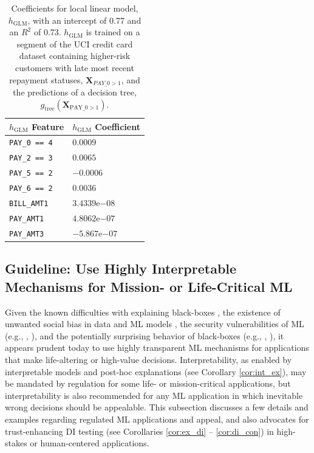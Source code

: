 \documentclass{article}
\begin{document}
\begin{table}
  	\caption{Coefficients for local linear model, $h_{\text{GLM}}$, with an intercept of 0.77 and an $R^2$ of 0.73. $h_{\text{GLM}}$ is trained on a segment of the UCI credit card dataset containing higher-risk customers with late most recent repayment statuses, $\mathbf{X}_{PAY \_ 0 > 1}$, and the predictions of a decision tree, $g_{\text{tree}}(\mathbf{X}_{\text{PAY\_0} > 1})$.\\}
  	\label{tab:lime}
  	\centering
  	\begin{tabular}{ll}
    	\toprule
    	$h_{\text{GLM}}$ Feature & $h_{\text{GLM}}$ Coefficient \\
    	\midrule
		\texttt{PAY\_0 == 4} & $0.0009$ \\
		\texttt{PAY\_2 == 3} & $0.0065$ \\
		\texttt{PAY\_5 == 2} & $-0.0006$ \\
		\texttt{PAY\_6 == 2} & $0.0036$ \\
		\texttt{BILL\_AMT1} & $3.4339\mathrm{e}{-08}$ \\
		\texttt{PAY\_AMT1} & $4.8062\mathrm{e}{-07}$ \\
		\texttt{PAY\_AMT3} & $-5.867\mathrm{e}{-07}$ \\
    	\bottomrule
  \end{tabular}
\end{table}

\subsection{Guideline: Use Highly Interpretable Mechanisms for Mission- or Life-Critical ML} \label{sec:white_box}

Given the known difficulties with explaining black-boxes \cite{please_stop}, the existence of unwanted social bias in data and ML models \cite{fairmlbook}, the security vulnerabilities of ML (e.g., \citet{membership_inference}, \citet{model_stealing}), and the potentially surprising behavior of black-boxes (e.g., \citet{easily_fooled}, \citet{intriguing_properties}), it appears prudent today to use highly transparent ML mechanisms for  applications that make life-altering or high-value decisions. Interpretability, as enabled by interpretable models and post-hoc explanations (see Corollary \ref{cor:int_ex}), may be mandated by regulation for some life- or mission-critical applications, but interpretability is also recommended for any ML application in which inevitable wrong decisions should be appealable. This subsection discusses a few details and examples regarding regulated ML applications and appeal, and also advocates for trust-enhancing DI testing (see Corollaries \ref{cor:ex_di} -- \ref{cor:di_con}) in high-stakes or human-centered applications.
\end{document}
